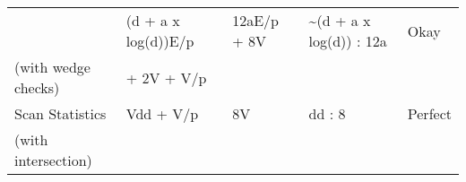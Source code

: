 \documentclass[10pt,oneside]{memoir}
\begin{document}
\begin{longtable}[]{@{}lllll@{}}
\begin{minipage}[t]{0.23\columnwidth}
\end{minipage} & \begin{minipage}[t]{0.12\columnwidth}\raggedright
(d + a x log(d))E/p\strut
\end{minipage} & \begin{minipage}[t]{0.15\columnwidth}\raggedright
12aE/p + 8V\strut
\end{minipage} & \begin{minipage}[t]{0.22\columnwidth}\raggedright
\textasciitilde{}(d + a x log(d)) : 12a\strut
\end{minipage} & \begin{minipage}[t]{0.13\columnwidth}\raggedright
Okay\strut
\end{minipage}\tabularnewline
\begin{minipage}[t]{0.23\columnwidth}\raggedright
(with wedge checks)\strut
\end{minipage} & \begin{minipage}[t]{0.12\columnwidth}\raggedright
+ 2V + V/p\strut
\end{minipage} & \begin{minipage}[t]{0.15\columnwidth}\raggedright
\strut
\end{minipage} & \begin{minipage}[t]{0.22\columnwidth}\raggedright
\strut
\end{minipage} & \begin{minipage}[t]{0.13\columnwidth}\raggedright
\strut
\end{minipage}\tabularnewline
\begin{minipage}[t]{0.23\columnwidth}\raggedright
Scan Statistics\strut
\end{minipage} & \begin{minipage}[t]{0.12\columnwidth}\raggedright
Vdd + V/p\strut
\end{minipage} & \begin{minipage}[t]{0.15\columnwidth}\raggedright
8V\strut
\end{minipage} & \begin{minipage}[t]{0.22\columnwidth}\raggedright
dd : 8\strut
\end{minipage} & \begin{minipage}[t]{0.13\columnwidth}\raggedright
Perfect\strut
\end{minipage}\tabularnewline
\begin{minipage}[t]{0.23\columnwidth}\raggedright
(with intersection)\strut
\end{minipage} & \begin{minipage}[t]{0.12\columnwidth}\raggedright
\strut
\end{minipage} & \begin{minipage}[t]{0.15\columnwidth}\raggedright
\strut
\end{minipage} & \begin{minipage}[t]{0.22\columnwidth}\raggedright
\strut
\end{minipage} & \begin{minipage}[t]{0.13\columnwidth}\raggedright
\strut
\end{minipage}\tabularnewline
\bottomrule
\end{longtable}
\end{document}
